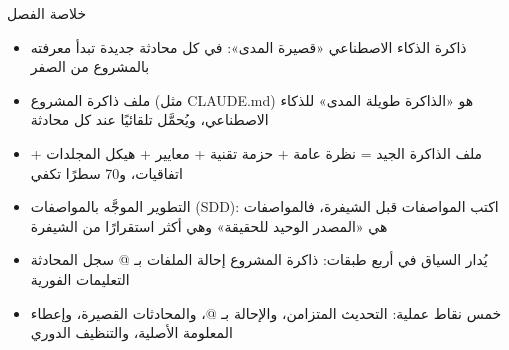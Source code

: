 \begin{tcbsummary}{خلاصة الفصل}
\begin{itemize}
  \item ذاكرة الذكاء الاصطناعي «قصيرة المدى»: في كل محادثة جديدة تبدأ معرفته بالمشروع من الصفر
  \item ملف ذاكرة المشروع (مثل CLAUDE.md) هو «الذاكرة طويلة المدى» للذكاء الاصطناعي، ويُحمَّل تلقائيًا عند كل محادثة
  \item ملف الذاكرة الجيد = نظرة عامة + حزمة تقنية + معايير + هيكل المجلدات + اتفاقيات، و70 سطرًا تكفي
  \item التطوير الموجَّه بالمواصفات (SDD): اكتب المواصفات قبل الشيفرة، فالمواصفات هي «المصدر الوحيد للحقيقة» وهي أكثر استقرارًا من الشيفرة
  \item يُدار السياق في أربع طبقات: ذاكرة المشروع إحالة الملفات بـ @ سجل المحادثة التعليمات الفورية
  \item خمس نقاط عملية: التحديث المتزامن، والإحالة بـ @، والمحادثات القصيرة، وإعطاء المعلومة الأصلية، والتنظيف الدوري
\end{itemize}

\end{tcbsummary}
